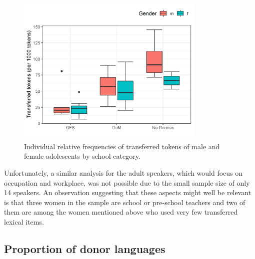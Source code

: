 \documentclass[output=paper]{langsci/langscibook}
\begin{document}
  
\begin{figure}
\includegraphics[width=0.8\textwidth]{figures/brackefig2.png}
 \caption{Individual relative frequencies of transferred tokens of male and female adolescents by school category.}
 \label{fig:bracke:2}
 \end{figure}
  

Unfortunately, a similar analysis for the adult speakers, which would focus on occupation and workplace, was not possible due to the small sample size of only 14 speakers. An observation suggesting that these aspects might well be relevant is that three women in the sample are school or pre-school teachers and two of them are among the women mentioned above who used very few transferred lexical items.

 
   
\subsection{Proportion of donor languages}
\label{sec:bracke:5.2}
\end{document}
